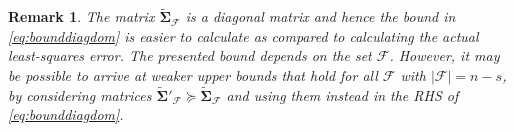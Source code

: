 \documentclass[journal,draftcls,onecolumn]{IEEEtran}
\theoremstyle{mystyle}
\newtheorem{remark}{Remark}
\newcommand{\bfA}{\mathbf{A}}
\newcommand{\bfB}{\mathbf{B}}
\newcommand{\bfv}{\mathbf{v}}
\newcommand{\cF}{\mathcal{F}}
\newcommand{\aditya}[1]{\marginpar{+}{\bf Aditya's remark}: {\em #1}}
\newcommand{\sifat}[1]{\marginpar{+}{\bf Sifat's remark}: {\em #1}}
\begin{document}

\begin{remark}
    The matrix $\tilde{\mathbf{\Sigma}}_{\mathcal{F}}$ is a diagonal matrix and hence the bound in \eqref{eq:bounddiagdom} is easier to calculate as compared to calculating the actual least-squares error. The presented bound depends on the set $\cF$. However, it may be possible to arrive at weaker upper bounds that hold for all $\cF$ with $|\cF|=n-s$, by considering matrices $\tilde{\mathbf{\Sigma}}'_{\mathcal{F}} \succeq \tilde{\mathbf{\Sigma}}_{\mathcal{F}}$ and using them instead in the RHS of \eqref{eq:bounddiagdom}.
\end{remark}


\end{document}
